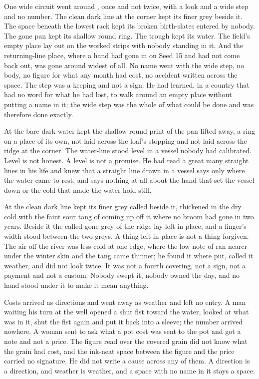 One wide circuit went around , once and not twice, with a look and a wide step and no number. The clean dark line at the corner kept its finer grey beside it. The space beneath the lowest rack kept its broken birth-slates entered by nobody. The gone pan kept its shallow round ring. The trough kept its water. The field's empty place lay out on the worked strips with nobody standing in it. And the returning-line place, where a hand had gone in on Seed 15 and had not come back out, was gone around widest of all. No name went with the wide step, no body, no figure for what any month had cost, no accident written across the space. The step was a keeping and not a sign. He had learned, in a country that had no word for what he had lost, to walk around an empty place without putting a name in it; the wide step was the whole of what could be done and was therefore done exactly.

At  the bare dark water kept the shallow round print of the pan lifted away, a ring on a place of its own, not laid across the loaf's stopping and not laid across the ridge at the corner. The water-line stood level in a vessel nobody had calibrated. Level is not honest. A level is not a promise. He had read a great many straight lines in his life and knew that a straight line drawn in a vessel says only where the water came to rest, and says nothing at all about the hand that set the vessel down or the cold that made the water hold still.

At  the clean dark line kept its finer grey called  beside it, thickened in the dry cold with the faint sour tang of  coming up off it where no broom had gone in two years. Beside it the called-gone grey of the ridge lay left in place, and a finger's width stood between the two greys. A thing left in place is not a thing forgiven. The air off the river was less cold at one edge, where the low note of  ran nearer under the winter skin and the tang came thinner; he found it where put, called it weather, and did not look twice. It was not a fourth covering, not a sign, not a payment and not a custom. Nobody swept it, nobody owned the day, and no hand stood under it to make it mean anything.

Costs arrived as directions and went away as weather and left no entry. A man waiting his turn at the well opened a shut fist toward the water, looked at what was in it, shut the fist again and put it back into a sleeve; the number arrived nowhere. A woman sent to ask what a pot cost was sent to the pot and got a note and not a price. The figure read over the covered grain did not know what the grain had cost, and the ink-neat space between the figure and the price carried no signature. He did not write a cause across any of them. A direction is a direction, and weather is weather, and a space with no name in it stays a space.

